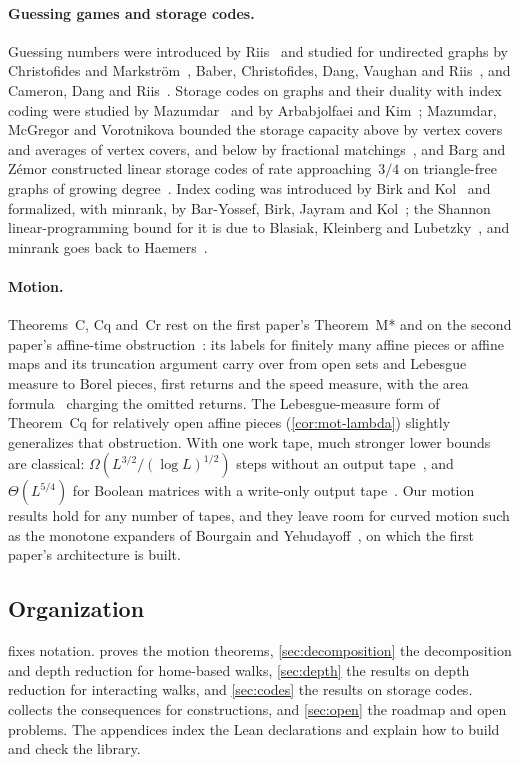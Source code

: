 \paragraph{Guessing games and storage codes.} Guessing numbers were introduced by Riis~\cite{Riis2007} and studied for
undirected graphs by Christofides and Markström~\cite{ChristofidesMarkstrom2011}, Baber, Christofides, Dang, Vaughan and
Riis~\cite{Baber2017}, and Cameron, Dang and Riis~\cite{CameronDangRiis2016}. Storage codes on graphs and their duality
with index coding were studied by Mazumdar~\cite{Mazumdar2014} and by Arbabjolfaei and Kim~\cite{ArbabjolfaeiKim2015};
Mazumdar, McGregor and Vorotnikova bounded the storage capacity above by vertex covers and averages of vertex covers,
and below by fractional matchings~\cite{MMV2019}, and Barg and Zémor constructed linear storage codes of rate
approaching~$3/4$ on triangle-free graphs of growing degree~\cite{BargZemor2022}. Index coding was introduced by Birk and
Kol~\cite{BirkKol2006} and formalized, with minrank, by Bar-Yossef, Birk, Jayram and Kol~\cite{BBJK2011}; the Shannon
linear-programming bound for it is due to Blasiak, Kleinberg and Lubetzky~\cite{BKL2013}, and minrank goes back to
Haemers~\cite{Haemers1979}.

\paragraph{Motion.} Theorems~C, Cq and~Cr rest on the first paper's Theorem~M* and on the second paper's affine-time
obstruction~\cite{SecondPaper2026}: its labels for finitely many affine pieces or affine maps and its truncation argument
carry over from open sets and Lebesgue measure to Borel pieces, first returns and the speed measure, with the area
formula~\cite{Federer1969} charging the omitted returns. The Lebesgue-measure form of Theorem~Cq for relatively open affine pieces
(\cref{cor:mot-lambda}) slightly generalizes that obstruction. With one work tape, much stronger lower bounds are classical:
$\Omega(L^{3/2}/(\log L)^{1/2})$ steps without an output tape~\cite{DMS1991}, and $\Theta(L^{5/4})$ for Boolean matrices
with a write-only output tape~\cite{DietzfelbingerMaass1993}. Our motion results hold for any number of tapes, and they
leave room for curved motion such as the monotone expanders of Bourgain and Yehudayoff~\cite{BourgainYehudayoff2013}, on
which the first paper's architecture is built.

\subsection{Organization}

 fixes notation.  proves the motion theorems, \cref{sec:decomposition} the
decomposition and depth reduction for home-based walks, \cref{sec:depth} the results on depth reduction for interacting
walks, and \cref{sec:codes} the results on storage codes.  collects the consequences for constructions, and
\cref{sec:open} the roadmap and open problems. The appendices index the Lean declarations and explain how to build and
check the library.
